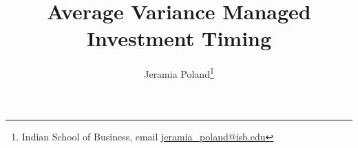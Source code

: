 \documentclass[11pt]{article}
\begin{document}
\onehalfspacing      %
\renewcommand{\footnote}{\endnote}  %

\author{Jeramia Poland\thanks{\rm Indian School of Business, email \href{mailto:jeramia_poland@isb.edu}{jeramia\_poland@isb.edu} \newline
		\protect } }

\title{\Large \bf Average Variance Managed Investment Timing}

\date{}              %


\maketitle
\thispagestyle{empty}
%
%
%
%
%
%
%
%
%
%
%
%
%
%
%
%
%
%
%
%
%
%
%
%
%
%
%
\end{document}
